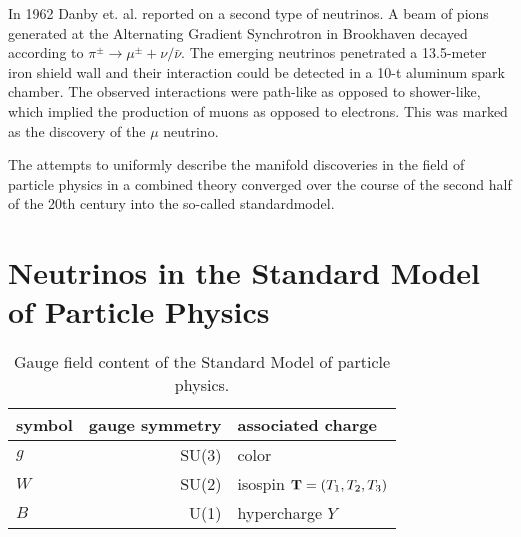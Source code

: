     In 1962 Danby et. al. reported on a second type of neutrinos. A beam of pions generated at the Alternating Gradient Synchrotron in Brookhaven decayed according to $\pi^{\pm} \rightarrow \mu^{\pm} + \nu / \bar\nu$. The emerging neutrinos penetrated a 13.5-meter iron shield wall and their interaction could be detected in a 10-t aluminum spark chamber. The observed interactions were path-like as opposed to shower-like, which implied the production of muons as opposed to electrons. This was marked as the discovery of the $\mu$ neutrino. \cite{Danby1962}
    
    The attempts to uniformly describe the manifold discoveries in the field of particle physics in a combined theory converged over the course of the second half of the 20th century into the so-called \gls{standardmodel}.
    
    \section{Neutrinos in the Standard Model of Particle Physics}
        \begin{table}[tb]
        \caption[Gauge field content of the Standard Model]{Gauge field content of the Standard Model of particle physics.}
        \centering
        \begin{tabular}{lrl}
        \toprule
        symbol & gauge symmetry & associated charge \\
        \hline
        $g$ & SU(3) & color \\
        $W$ & SU(2) & isospin $\boldsymbol{\mathbf{T}}=(T_1, T_2, T_3)$ \\
        $B$ & U(1) &  hypercharge $Y$\\
        \bottomrule
        \end{tabular}
        \label{tab:SMGaugeFields}
    \end{table}
    

